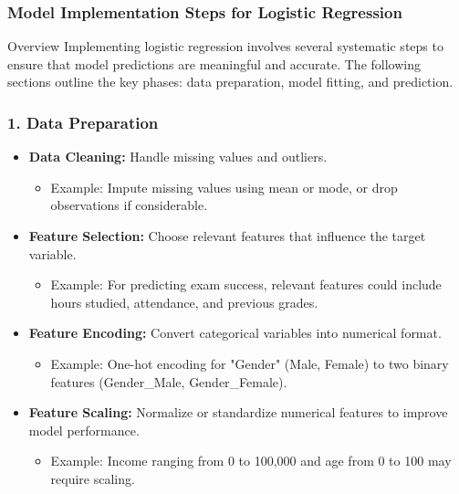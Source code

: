 \documentclass[aspectratio=169]{beamer}
\begin{document}
\begin{frame}
  \frametitle{Model Implementation Steps for Logistic Regression}
  \begin{block}{Overview}
    Implementing logistic regression involves several systematic steps to ensure that model predictions are meaningful and accurate. The following sections outline the key phases: data preparation, model fitting, and prediction.
  \end{block}
\end{frame}

\begin{frame}
  \frametitle{1. Data Preparation}
  \begin{itemize}
    \item \textbf{Data Cleaning:} Handle missing values and outliers.
    \begin{itemize}
      \item Example: Impute missing values using mean or mode, or drop observations if considerable.
    \end{itemize}
    
    \item \textbf{Feature Selection:} Choose relevant features that influence the target variable.
    \begin{itemize}
      \item Example: For predicting exam success, relevant features could include hours studied, attendance, and previous grades.
    \end{itemize}
    
    \item \textbf{Feature Encoding:} Convert categorical variables into numerical format.
    \begin{itemize}
      \item Example: One-hot encoding for "Gender" (Male, Female) to two binary features (Gender\_Male, Gender\_Female).
    \end{itemize}
    
    \item \textbf{Feature Scaling:} Normalize or standardize numerical features to improve model performance.
    \begin{itemize}
      \item Example: Income ranging from 0 to 100,000 and age from 0 to 100 may require scaling.
    \end{itemize}
  \end{itemize}
\end{frame}
\end{document}
